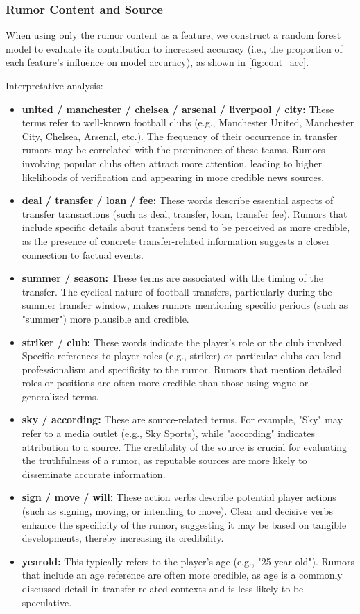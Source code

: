 \subsubsection{Rumor Content and Source}

When using only the rumor content as a feature, we construct a random forest model to evaluate its contribution to increased accuracy (i.e., the proportion of each feature's influence on model accuracy), as shown in \autoref{fig:cont_acc}.

Interpretative analysis:

\begin{itemize}
    \item \textbf{united / manchester / chelsea / arsenal / liverpool / city:} These terms refer to well-known football clubs (e.g., Manchester United, Manchester City, Chelsea, Arsenal, etc.). The frequency of their occurrence in transfer rumors may be correlated with the prominence of these teams. Rumors involving popular clubs often attract more attention, leading to higher likelihoods of verification and appearing in more credible news sources. 
    \item \textbf{deal / transfer / loan / fee:} These words describe essential aspects of transfer transactions (such as deal, transfer, loan, transfer fee). Rumors that include specific details about transfers tend to be perceived as more credible, as the presence of concrete transfer-related information suggests a closer connection to factual events. 
    \item \textbf{summer / season:} These terms are associated with the timing of the transfer. The cyclical nature of football transfers, particularly during the summer transfer window, makes rumors mentioning specific periods (such as "summer") more plausible and credible. 
    \item \textbf{striker / club:} These words indicate the player's role or the club involved. Specific references to player roles (e.g., striker) or particular clubs can lend professionalism and specificity to the rumor. Rumors that mention detailed roles or positions are often more credible than those using vague or generalized terms. 
    \item \textbf{sky / according:} These are source-related terms. For example, "Sky" may refer to a media outlet (e.g., Sky Sports), while "according" indicates attribution to a source. The credibility of the source is crucial for evaluating the truthfulness of a rumor, as reputable sources are more likely to disseminate accurate information. 
    \item \textbf{sign / move / will:} These action verbs describe potential player actions (such as signing, moving, or intending to move). Clear and decisive verbs enhance the specificity of the rumor, suggesting it may be based on tangible developments, thereby increasing its credibility. 
    \item \textbf{yearold:} This typically refers to the player's age (e.g., "25-year-old"). Rumors that include an age reference are often more credible, as age is a commonly discussed detail in transfer-related contexts and is less likely to be speculative. 
\end{itemize}

